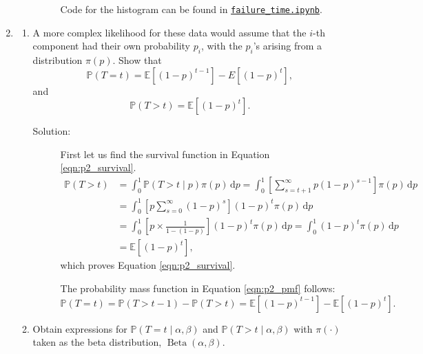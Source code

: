 \documentclass[letterpaper,11pt]{article}
\begin{document}
\begin{enumerate}
\begin{enumerate}
\begin{description}
      Code for the histogram can be found in
      \href{http://nbviewer.jupyter.org/github/ppham27/stat570/blob/master/final/failure\_time.ipynb}{\texttt{failure\_time.ipynb}}.
    \end{description}
  \end{enumerate}
\item
  \begin{enumerate}
  \item A more complex likelihood for these data would assume that the $i$-th
    component had their own probability $p_i$, with the $p_i$'s arising from a
    distribution $\pi\left(p\right)$. Show that
      \begin{equation}
        \mathbb{P}\left(T = t\right) =
        \mathbb{E}\left[(1 - p)^{t-1}\right] -
        E[(1 - p)^t],
        \label{eqn:p2_pmf}
      \end{equation}
      and
      \begin{equation}
        \mathbb{P}\left(T > t\right) = \mathbb{E}\left[(1 - p)^t\right].
        \label{eqn:p2_survival}
      \end{equation}
      \begin{description}
      \item[Solution:] First let us find the survival function in
        Equation \ref{eqn:p2_survival}.
        \begin{align*}
          \mathbb{P}\left(T > t\right)
          &= \int_0^1
          \mathbb{P}\left(T > t \mid p\right)
          \pi\left(p\right)\,\mathrm{d}p 
          = \int_0^1 \left[\sum_{s=t + 1}^\infty p(1 - p)^{s-1}\right]
            \pi\left(p\right)
          \,\mathrm{d}p \\
          &= \int_0^1 \left[p\sum_{s=0}^\infty (1 - p)^s\right]
            (1 - p)^t
            \pi\left(p\right)
            \,\mathrm{d}p \\
          &= \int_0^1 \left[p \times \frac{1}{1 - (1-p)}\right]
            (1 - p)^t
            \pi\left(p\right)
            \,\mathrm{d}p
          = \int_0^1 (1 - p)^t
            \pi\left(p\right)
            \,\mathrm{d}p \\
          &= \mathbb{E}\left[\left(1-p\right)^t\right],
        \end{align*}
        which proves Equation \ref{eqn:p2_survival}.

        The probability mass function in Equation \ref{eqn:p2_pmf} follows:
        \begin{equation*}
          \mathbb{P}\left(T = t\right)
          = \mathbb{P}\left(T > t - 1\right)
          - \mathbb{P}\left(T > t\right)
          = \mathbb{E}\left[\left(1-p\right)^{t-1}\right]
          - \mathbb{E}\left[\left(1-p\right)^{t}\right].
        \end{equation*}
      \end{description}
    \item Obtain expressions for
      $\mathbb{P}\left(T = t \mid \alpha, \beta\right)$ and
      $\mathbb{P}\left(T > t \mid \alpha, \beta\right)$ with
      $\pi\left(\cdot\right)$ taken as the beta distribution,
      $\operatorname{Beta}\left(\alpha, \beta\right)$.


\end{enumerate}
\end{enumerate}
\end{document}
